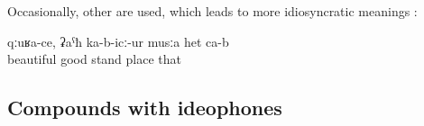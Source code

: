 Occasionally, other  are used, which leads to more idiosyncratic meanings :
%
\begin{exe}
	\ex	\label{ex:This is a beautiful, pleasant place}
	\gll	qːuʁa-ce,	ʡaˁħ	ka-b-icː-ur	musːa	het	ca-b\\
		beautiful	good	stand	place	that	\\
	\glt	{}
	

\end{exe}



\subsection{Compounds with ideophones}
\label{ssec:compoundswithideophones}


